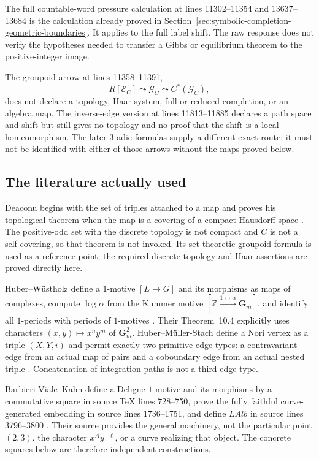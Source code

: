 The full countable-word pressure calculation at lines 11302--11354 and
13637--13684 is the calculation already proved in
Section~\ref{sec:symbolic-completion-geometric-boundaries}.  It applies to
the full label shift.  The raw response does not verify the hypotheses needed
to transfer a Gibbs or equilibrium theorem to the positive-integer image.

The groupoid arrow at lines 11358--11391,
\[
 R[\mathcal E_C]\leadsto\mathcal G_C\leadsto C^*(\mathcal G_C),
\]
does not declare a topology, Haar system, full or reduced completion, or an
algebra map.  The inverse-edge version at lines 11813--11885 declares a path
space and shift but still gives no topology and no proof that the shift is a
local homeomorphism.  The later $3$-adic formulas supply a different exact
route; it must not be identified with either of those arrows without the maps
proved below.

\subsection{The literature actually used}

Deaconu begins with the set of triples attached to a map and proves his
topological theorem when the map is a covering of a compact Hausdorff space
\cite[printed pp.~1779--1781]{Deaconu1995}.  The positive-odd set with the
discrete topology is not compact and $C$ is not a self-covering, so that
theorem is not invoked.  Its set-theoretic groupoid formula is used as a
reference point; the required discrete topology and Haar assertions are
proved directly here.

Huber--W\"ustholz define a $1$-motive $[L\to G]$ and its morphisms as maps of
complexes, compute $\log\alpha$ from the Kummer motive
$[\mathbb Z\xrightarrow{1\mapsto\alpha}\mathbf G_m]$, and identify all
$1$-periods with periods of $1$-motives
\cite[Definition~8.1, Section~10.2, and Proposition~12.10]{HuberWustholz2022}.
Their Theorem~10.4 explicitly uses characters
$(x,y)\mapsto x^ny^m$ of $\mathbf G_m^2$.
Huber--M\"uller-Stach define a Nori vertex as a triple $(X,Y,i)$ and permit
exactly two primitive edge types: a contravariant edge from an actual map of
pairs and a coboundary edge from an actual nested triple
\cite[Definition~9.1.1]{HuberMullerStach2025}.  Concatenation of integration
paths is not a third edge type.

Barbieri-Viale--Kahn define a Deligne $1$-motive and its morphisms by a
commutative square in source TeX lines 728--750, prove the fully faithful
curve-generated embedding in source lines 1736--1751, and define $LAlb$ in
source lines 3796--3800 \cite{BarbieriVialeKahn2016}.  Their source provides
the general machinery, not the particular point $(2,3)$, the character
$x^Ay^{-\ell}$, or a curve realizing that object.  The concrete squares below
are therefore independent constructions.

